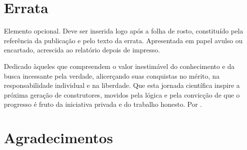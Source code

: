 \documentclass[a4paper,12pt,brazilian,oneside]{Arquivos/Relatorio}
\begin{document}
 
\nocite{*}


\pretextual


\folhaderosto
\contracapa
\fichacatalografica




\chapter*{Errata}
\noindent Elemento opcional. Deve ser inserida logo após a folha de rosto, constituído pela referência da publicação e pelo texto da errata. Apresentada em papel avulso ou encartado, acrescida ao relatório depois de impresso.\\[1em]




\folhadeaprovacao{\today}




\begin{dedicatoria}
    Dedicado àqueles que compreendem o valor
    inestimável do conhecimento e da busca incessante
    pela verdade, alicerçando suas conquistas no mérito,
    na responsabilidade individual e na liberdade.
    Que esta jornada científica inspire a próxima
    geração de construtores, movidos pela lógica
    e pela convicção de que o progresso 
    é fruto da iniciativa privada e do 
    trabalho honesto. Por \WenesTex.
\end{dedicatoria}




\chapter*{Agradecimentos}
\emph{\WenesTex} \lipsum[101]
\end{document}

